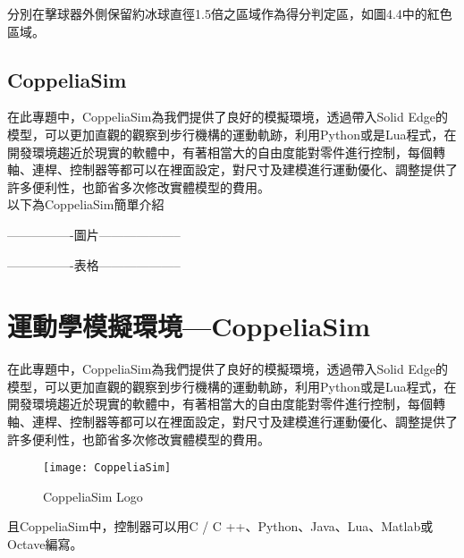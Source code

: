 \newpage
\qquad 分別在擊球器外側保留約冰球直徑1.5倍之區域作為得分判定區，如圖4.4中的紅色區域。\\

\subsection{CoppeliaSim}
在此專題中，CoppeliaSim為我們提供了良好的模擬環境，透過帶入Solid Edge的模型，可以更加直觀的觀察到步行機構的運動軌跡，利用Python或是Lua程式，在開發環境趨近於現實的軟體中，有著相當大的自由度能對零件進行控制，每個轉軸、連桿、控制器等都可以在裡面設定，對尺寸及建模進行運動優化、調整提供了許多便利性，也節省多次修改實體模型的費用。\\

以下為CoppeliaSim簡單介紹\

----------------圖片--------------------

----------------表格--------------------


\section{運動學模擬環境---CoppeliaSim}

在此專題中，CoppeliaSim為我們提供了良好的模擬環境，透過帶入Solid Edge的模型，可以更加直觀的觀察到步行機構的運動軌跡，利用Python或是Lua程式，在開發環境趨近於現實的軟體中，有著相當大的自由度能對零件進行控制，每個轉軸、連桿、控制器等都可以在裡面設定，對尺寸及建模進行運動優化、調整提供了許多便利性，也節省多次修改實體模型的費用。\\

 \begin{figure}[hbt!]
\center
\texttt{[image: CoppeliaSim]}
\caption{\Large CoppeliaSim Logo}
\end{figure}

且CoppeliaSim中，控制器可以用C / C ++、Python、Java、Lua、Matlab或Octave編寫。\\
